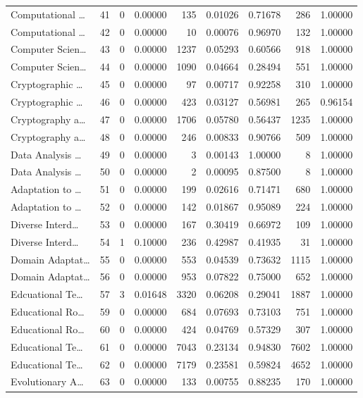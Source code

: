 \begin{table}
\begin{tabular}{lrrrrrrrr}
Computational … & 41 & 0 & 0.00000 & 135 & 0.01026 & 0.71678 & 286 & 1.00000 \\
Computational … & 42 & 0 & 0.00000 & 10 & 0.00076 & 0.96970 & 132 & 1.00000 \\
Computer Scien… & 43 & 0 & 0.00000 & 1237 & 0.05293 & 0.60566 & 918 & 1.00000 \\
Computer Scien… & 44 & 0 & 0.00000 & 1090 & 0.04664 & 0.28494 & 551 & 1.00000 \\
Cryptographic … & 45 & 0 & 0.00000 & 97 & 0.00717 & 0.92258 & 310 & 1.00000 \\
Cryptographic … & 46 & 0 & 0.00000 & 423 & 0.03127 & 0.56981 & 265 & 0.96154 \\
Cryptography a… & 47 & 0 & 0.00000 & 1706 & 0.05780 & 0.56437 & 1235 & 1.00000 \\
Cryptography a… & 48 & 0 & 0.00000 & 246 & 0.00833 & 0.90766 & 509 & 1.00000 \\
Data Analysis … & 49 & 0 & 0.00000 & 3 & 0.00143 & 1.00000 & 8 & 1.00000 \\
Data Analysis … & 50 & 0 & 0.00000 & 2 & 0.00095 & 0.87500 & 8 & 1.00000 \\
Adaptation to … & 51 & 0 & 0.00000 & 199 & 0.02616 & 0.71471 & 680 & 1.00000 \\
Adaptation to … & 52 & 0 & 0.00000 & 142 & 0.01867 & 0.95089 & 224 & 1.00000 \\
Diverse Interd… & 53 & 0 & 0.00000 & 167 & 0.30419 & 0.66972 & 109 & 1.00000 \\
Diverse Interd… & 54 & 1 & 0.10000 & 236 & 0.42987 & 0.41935 & 31 & 1.00000 \\
Domain Adaptat… & 55 & 0 & 0.00000 & 553 & 0.04539 & 0.73632 & 1115 & 1.00000 \\
Domain Adaptat… & 56 & 0 & 0.00000 & 953 & 0.07822 & 0.75000 & 652 & 1.00000 \\
Edcuational Te… & 57 & 3 & 0.01648 & 3320 & 0.06208 & 0.29041 & 1887 & 1.00000 \\
Educational Ro… & 59 & 0 & 0.00000 & 684 & 0.07693 & 0.73103 & 751 & 1.00000 \\
Educational Ro… & 60 & 0 & 0.00000 & 424 & 0.04769 & 0.57329 & 307 & 1.00000 \\
Educational Te… & 61 & 0 & 0.00000 & 7043 & 0.23134 & 0.94830 & 7602 & 1.00000 \\
Educational Te… & 62 & 0 & 0.00000 & 7179 & 0.23581 & 0.59824 & 4652 & 1.00000 \\
Evolutionary A… & 63 & 0 & 0.00000 & 133 & 0.00755 & 0.88235 & 170 & 1.00000 \\

\end{tabular}
\end{table}
